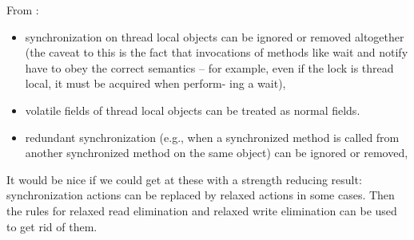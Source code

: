 From \cite{Manson:2005:JMM:1047659.1040336}:
\begin{itemize}
\item synchronization on thread local objects can be ignored or removed
  altogether (the caveat to this is the fact that invocations of methods like
  wait and notify have to obey the correct semantics – for example, even if
  the lock is thread local, it must be acquired when perform- ing a wait),
   
\item volatile fields of thread local objects can be treated as normal
  fields.

\item redundant synchronization (e.g., when a synchronized method is called
  from another synchronized method on the same object) can be ignored or
  removed,
  
\end{itemize}

It would be nice if we could get at these with a strength reducing result:
synchronization actions can be replaced by relaxed actions in some cases.
Then the rules for relaxed read elimination and relaxed write elimination can
be used to get rid of them.

  
